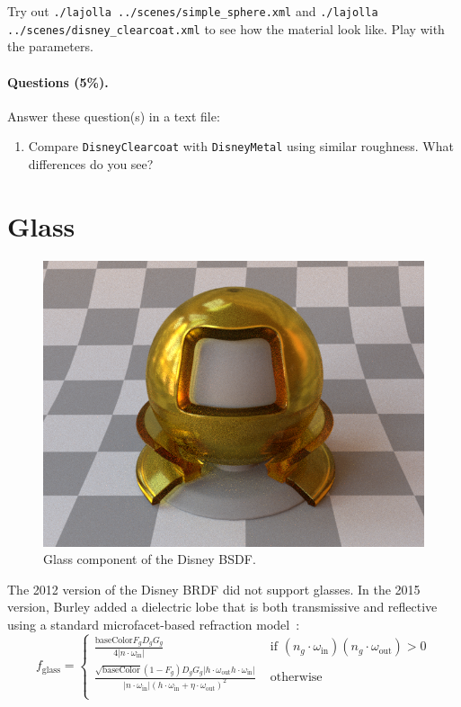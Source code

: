 Try out \lstinline{./lajolla ../scenes/simple_sphere.xml} and \lstinline{./lajolla ../scenes/disney_clearcoat.xml} to see how the material look like. Play with the parameters.

\paragraph{Questions (5\%).} Answer these question(s) in a text file:
\begin{enumerate}
	\item Compare \lstinline{DisneyClearcoat} with \lstinline{DisneyMetal} using similar roughness. What differences do you see?
\end{enumerate}

\section{Glass}
\begin{figure}
	\centering
	\includegraphics[width=0.5\linewidth]{imgs/disney_glass.png}
	\caption{Glass component of the Disney BSDF.}
\end{figure}

The 2012 version of the Disney BRDF did not support glasses. In the 2015 version, Burley added a dielectric lobe that is both transmissive and reflective using a standard microfacet-based refraction model~\cite{Walter:2007:MMR}:
\begin{equation}
f_{\text{glass}} = \begin{cases}
\frac{\text{baseColor} F_g D_g G_g}{4 |n \cdot \omega_{\text{in}}|} & \mbox{ if } \left(n_g \cdot \omega_{\text{in}}\right) \left(n_g \cdot \omega_{\text{out}}\right) > 0 \\
\frac{\sqrt{\text{baseColor}} (1 - F_g) D_g G_g \left|h \cdot \omega_{\text{out}} h \cdot \omega_{\text{in}} \right|}{
\left|n \cdot \omega_{\text{in}}\right| \left( h \cdot \omega_{\text{in}} + \eta \cdot \omega_{\text{out}} \right)^2} & \mbox{ otherwise}\\
\end{cases}
\label{eq:f_glass}
\end{equation}

